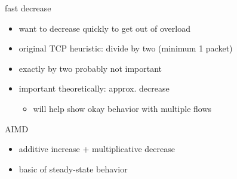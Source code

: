 \begin{frame}{fast decrease}
    \begin{itemize}
    \item want to decrease quickly to get out of overload
    \item original TCP heuristic: divide by two (minimum 1 packet)
    \vspace{.5cm}
    \item<2-> exactly by two probably not important
    \item<2-> important theoretically: approx.  decrease
        \begin{itemize}
        \item will help show okay behavior with multiple flows
        \end{itemize}
    \end{itemize}
\end{frame}

\begin{frame}{AIMD}
    \begin{itemize}
    \item additive increase + multiplicative decrease
    \item basic of steady-state behavior
    \end{itemize}
\end{frame}
